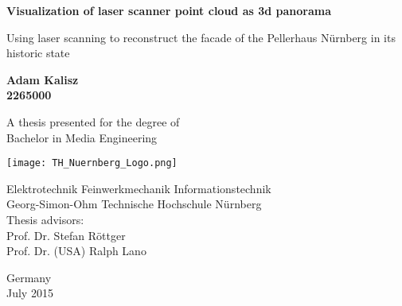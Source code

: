 \begin{titlepage}
	\begin{center}
		\vspace*{1cm}
		
		\Huge
		\textbf{Visualization of laser scanner point cloud as 3d panorama}
		
		\vspace{0.5cm}
		\LARGE
		Using laser scanning to reconstruct the facade of the Pellerhaus Nürnberg in its historic state
		
		\vspace{1.5cm}
		
		\textbf{Adam Kalisz}\\
		\textbf{2265000}\\
		
		\vspace{1.5cm}
				
		
		A thesis presented for the degree of\\
		Bachelor in Media Engineering
		
		\vfill
		
		\vspace{0.8cm}
		
		{\texttt{[image: TH\_Nuernberg\_Logo.png]}}
		
		\Large
		Elektrotechnik Feinwerkmechanik Informationstechnik\\
		Georg-Simon-Ohm Technische Hochschule Nürnberg\\
		
		\vspace{0.8cm}
		Thesis advisors:\\
		Prof. Dr. Stefan Röttger\\
		Prof. Dr. (USA) Ralph Lano\\	
		\vspace{0.8cm}
		
		
		Germany\\
		July 2015
		
		
		
	\end{center}
\end{titlepage}